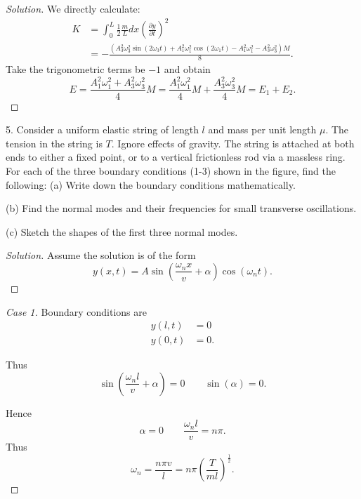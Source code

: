 \begin{proof}[Solution]
	We directly calculate:
	\begin{align*}
		K &= \int _0^L \frac{1}{2} \frac{m}{L}dx \left( \frac{\partial y}{\partial t}  \right) ^2\\
		&= -\frac{\left(A_3^2 \omega_3^2 \sin \left(2 \omega_3 t\right)+A_1^2 \omega_1^2 \cos \left(2 \omega_1 t\right)-A_1^2 \omega_1^2-A_3^2 \omega_3^2\right) M}{8}
	.\end{align*}
	Take the trigonometric terms be $-1$ and obtain
	 \[
		E = \frac{A_1^2 \omega_1^2+A_3^2 \omega_3^2}{4}M =  
		\frac{A_1^2 \omega_1^2}{4}M
		+
 \frac{A_3^2 \omega_3^2}{4}M
 = E_1 + E_2
	.\] 
\end{proof}
\newpage

5. Consider a uniform elastic string of length $l$ and mass per unit length $\mu$. The tension in the string is $T$. Ignore effects of gravity. The string is attached at both ends to either a fixed point, or to a vertical frictionless rod via a massless ring. For each of the three boundary conditions (1-3) shown in the figure, find the following:
(a) Write down the boundary conditions mathematically.

(b) Find the normal modes and their frequencies for small transverse oscillations.

(c) Sketch the shapes of the first three normal modes.

\begin{proof}[Solution]
	Assume the solution is of the form
	\[
		y(x,t) = A \sin\left( \frac{\omega_n x}{v} + \alpha\right) \cos(\omega_n t)  
	.\] 
\end{proof}

\begin{proof}[Case 1]
	Boundary conditions are
	\begin{align*}
		y(l, t) &= 0 \\
		y(0, t) &= 0
	.\end{align*}

	Thus
	\[
		\sin\left(\frac{\omega_n l}{v} + \alpha\right) = 0 \qquad \sin(\alpha) = 0
	.\] 

	Hence
	\[
		\alpha = 0 \qquad \frac{\omega_n l}{v} = n \pi
	.\] 
	Thus
	\[
		\omega_n = \frac{n \pi v}{l} = n \pi \left( \frac{T}{m l} \right) ^{\frac{1}{2}}
	.\] 


\end{proof}


